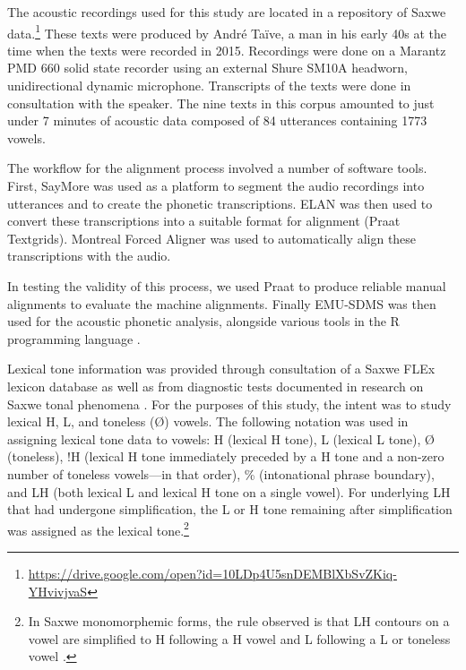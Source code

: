 \documentclass[
  11pt,
  b5paper,
]{article}
\begin{document}
The acoustic recordings used for this study are located in a repository
of Saxwe data.\footnote{\url{https://drive.google.com/open?id=10LDp4U5snDEMBlXbSvZKiq-YHvivjvaS}}
These texts were produced by André Taïve, a man in his early 40s at the
time when the texts were recorded in 2015. Recordings were done on a
Marantz PMD 660 solid state recorder using an external Shure SM10A
headworn, unidirectional dynamic microphone. Transcripts of the texts
were done in consultation with the speaker. The nine texts in this
corpus amounted to just under 7 minutes of acoustic data composed of 84
utterances containing 1773 vowels.

The workflow for the alignment process involved a number of software
tools. First, SayMore \autocite{sil_international_saymore_2019} was used
as a platform to segment the audio recordings into utterances and to
create the phonetic transcriptions. ELAN \autocite{elan_elan_2019} was
then used to convert these transcriptions into a suitable format for
alignment (Praat Textgrids). Montreal Forced Aligner
\autocite{mcauliffe_montreal_2018} was used to automatically align these
transcriptions with the audio.

In testing the validity of this process, we used Praat
\autocite{boersma_praat_2019} to produce reliable manual alignments to
evaluate the machine alignments. Finally EMU-SDMS
\autocite{winkelmann_emu-sdms:_2017} was then used for the acoustic
phonetic analysis, alongside various tools in the R programming language
\autocite{r_core_team_r_2020,wickham_tidyverse_2017,aphalo_ggpmisc_2022}.

Lexical tone information was provided through consultation of a Saxwe
FLEx lexicon database
\autocite{sil_international_fieldworks_2017,beavon-ham_saxwe_2020} as
well as from diagnostic tests documented in research on Saxwe tonal
phenomena \autocite{Beavon-Ham2019Tone}. For the purposes of this study,
the intent was to study lexical H, L, and toneless (Ø) vowels. The
following notation was used in assigning lexical tone data to vowels: H
(lexical H tone), L (lexical L tone), Ø (toneless), !H (lexical H tone
immediately preceded by a H tone and a non-zero number of toneless
vowels---in that order), \% (intonational phrase boundary), and LH (both
lexical L and lexical H tone on a single vowel). For underlying LH that
had undergone simplification, the L or H tone remaining after
simplification was assigned as the lexical tone.\footnote{In Saxwe
  monomorphemic forms, the rule observed is that LH contours on a vowel
  are simplified to H following a H vowel and L following a L or
  toneless vowel \autocite{Beavon-Ham2019Tone}.}
\end{document}
